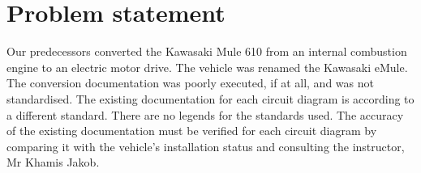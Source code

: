 \section*{Problem statement}
Our predecessors converted the \glqq Kawasaki Mule 610\grqq{} from an internal combustion engine to an electric motor drive. The vehicle was renamed the \glqq Kawasaki eMule\grqq{}. The conversion documentation was poorly executed, if at all, and was not standardised. The existing documentation for each circuit diagram is according to a different standard. There are no legends for the standards used. The accuracy of the existing documentation must be verified for each circuit diagram by comparing it with the vehicle's installation status and consulting the instructor, Mr Khamis Jakob.


